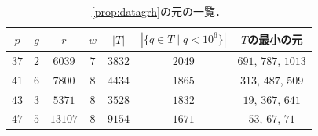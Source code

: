 \documentclass[11pt,a4paper]{ltjsarticle}
\theoremstyle{ja}
\begin{document}
\begin{table}[ht]
\centering
\begin{tabular}{ccccccc}
\toprule
$p$ & $g$ & $r$ & $w$ & $|T|$ & $|\{q \in T \mid q < 10^6\}|$ & $T$の最小の元 \\
\midrule
$37$ & $2$ & $6039$ & $7$ & $3832$ & $2049$ & $691$, $787$, $1013$ \\
$41$ & $6$ & $7800$ & $8$ & $4434$ & $1865$ & $313$, $487$, $509$ \\
$43$ & $3$ & $5371$ & $8$ & $3528$ & $1832$ & $19$, $367$, $641$ \\
$47$ & $5$ & $13107$ & $8$ & $9154$ & $1671$ & $53$, $67$, $71$ \\
\bottomrule
\end{tabular}
\caption{\cref{prop:datagrh}の元の一覧．}
\label{tab:grh}
\end{table}
\end{document}
